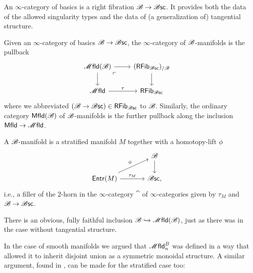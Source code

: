 \documentclass[../text]{subfiles}
\begin{document}
\begin{definition}
    An $\infty$-category of basics is a right fibration $\mathscr{B} \rightarrow \mathscr{B} \mathsf{sc}$. It provides both the data of the allowed singularity types and the data of (a generalization of) tangential structure.
\end{definition}

\begin{definition}
    Given an $\infty$-category of basics $\mathscr{B} \rightarrow \mathscr{B} \mathsf{sc}$, the $\infty$-category of $\mathscr{B}$-manifolds is the pullback
    \begin{equation}
        \begin{tikzcd}
            \mfld(\bstr) \arrow[dr, phantom, "\ulcorner", very near start] \arrow[r] \arrow[d] & (\mathsf{RFib}_{\bsc})_{/\bstr} \arrow[d] \\
            \mfld \arrow[r, "\tau"] & \mathsf{RFib}_{\bsc}
        \end{tikzcd}
    \end{equation}
    where we abbreviated $(\mathscr{B}\to\mathscr{B} \mathsf{sc})\in\mathsf{RFib}_{\mathscr{B} \mathsf{sc}}$ to $\mathscr{B}$. Similarly, the ordinary category $\mfld[r](\bstr)$ of $\mathscr{B}$-manifolds is the further pullback along the inclusion $\mfld[r]\to\mfld$.
\end{definition}

\begin{remark}
    A $\mathscr{B}$-manifold is a stratified manifold $M$ together with a homotopy-lift $\phi$
    \begin{equation}
        \begin{tikzcd}[column sep = large]
            & \bstr \arrow[d] \\
            \mathsf{Entr}(M) \arrow[ru, "\phi"] \arrow[r, "\tau_M"] & \bsc,
        \end{tikzcd}
    \end{equation}
    i.e., a filler of the $2$-horn in the $\infty$-category $\cat$ of $\infty$-categories  given by $\tau_M$ and $\mathscr{B}\to\mathscr{B} \mathsf{sc}$.
\end{remark}

\begin{remark}
    There is an obvious, fully faithful inclusion $\bstr \xhookrightarrow{} \mfld(\bstr)$, just as there was in the case without tangential structure.
\end{remark}

In the case of smooth manifolds we argued that $\mfld_n^B$ was defined in a way that allowed it to inherit disjoint union as a symmetric monoidal structure. A similar argument, found in \cite{aft_fhstrat}, can be made for the stratified case too: 
\end{document}
